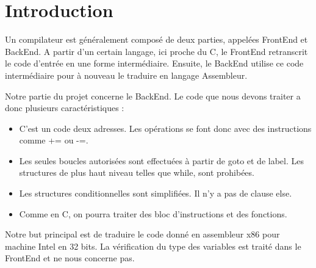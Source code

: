 \section*{Introduction}

Un compilateur est généralement composé de deux parties, appelées FrontEnd et BackEnd. A partir d'un certain langage, ici proche du C, le FrontEnd retranscrit le code d'entrée en une forme intermédiaire. Ensuite, le BackEnd utilise ce code intermédiaire pour à nouveau le traduire en langage Assembleur. 

Notre partie du projet concerne le BackEnd. 
Le code que nous devons traiter a donc plusieurs caractéristiques :
\begin{itemize}
\item C'est un code deux adresses. Les opérations se font donc avec des instructions comme += ou -=. 
\item Les seules boucles autorisées sont effectuées à partir de goto et de label. Les structures de plus haut niveau telles que while, sont prohibées.
\item Les structures conditionnelles sont simplifiées. Il n'y a pas de clause else.
\item Comme en C, on pourra traiter des bloc d'instructions et des fonctions.
\end{itemize}

Notre but principal est de traduire le code donné en assembleur x86 pour machine Intel en 32 bits. La vérification du type des variables est traité dans le FrontEnd et ne nous concerne pas.